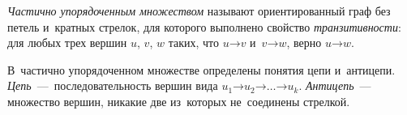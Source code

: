 



\begingroup
    \def\arrow{\mathord{\rightarrow}}%
    \def\abs#1{\lvert #1 \rvert}%

\emph{Частично упорядоченным множеством} называют ориентированный граф без
петель и~кратных стрелок, для которого выполнено свойство
\emph{транзитивности}:
для любых трех вершин $u$, $v$, $w$ таких, что $u \arrow v$ и~$v \arrow w$,
верно $u \arrow w$.

В~частично упорядоченном множестве определены понятия цепи и~антицепи.
\emph{Цепь}~---~последовательность вершин вида
$u_{1} \arrow u_{2} \arrow \ldots \arrow u_{k}$.
\emph{Антицепь}~--- множество вершин, никакие две из~которых не~соединены
стрелкой.

